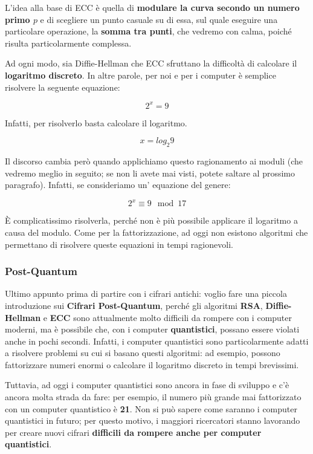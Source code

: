 \documentclass{report}
\begin{document}
L'idea alla base di ECC è quella di \textbf{modulare la curva secondo un numero primo $p$} e di scegliere un punto casuale su di essa, sul quale eseguire una particolare operazione, la \textbf{somma tra punti}, che vedremo con calma, poiché risulta particolarmente complessa.

Ad ogni modo, sia Diffie-Hellman che ECC sfruttano la difficoltà di calcolare il \textbf{logaritmo discreto}. In altre parole, per noi e per i computer è semplice risolvere la seguente equazione:

\begin{equation*}
    2 ^ x = 9
\end{equation*}

Infatti, per risolverlo basta calcolare il logaritmo.

\begin{equation*}
    x = log _ {2} 9
\end{equation*}

\newpage

Il discorso cambia però quando applichiamo questo ragionamento ai moduli (che vedremo meglio in seguito; se non li avete mai visti, potete saltare al prossimo paragrafo). Infatti, se consideriamo un' equazione del genere:

\begin{equation*}
    2 ^ x \equiv 9 \mod 17
\end{equation*}


È complicatissimo risolverla, perché non è più possibile applicare il logaritmo a causa del modulo. Come per la fattorizzazione, ad oggi non esistono algoritmi che permettano di risolvere queste equazioni in tempi ragionevoli.


\subsubsection{Post-Quantum}
Ultimo appunto prima di partire con i cifrari antichi: voglio fare una piccola introduzione sui \textbf{Cifrari Post-Quantum}, perché gli algoritmi \textbf{RSA}, \textbf{Diffie-Hellman} e \textbf{ECC} sono attualmente molto difficili da rompere con i computer moderni, ma è possibile che, con i computer \textbf{quantistici}, possano essere violati anche in pochi secondi. Infatti, i computer quantistici sono particolarmente adatti a risolvere problemi su cui si basano questi algoritmi: ad esempio, possono fattorizzare numeri enormi o calcolare il logaritmo discreto in tempi brevissimi.

Tuttavia, ad oggi i computer quantistici sono ancora in fase di sviluppo e c’è ancora molta strada da fare: per esempio, il numero più grande mai fattorizzato con un computer quantistico è \textbf{21}. Non si può sapere come saranno i computer quantistici in futuro; per questo motivo, i maggiori ricercatori stanno lavorando per creare nuovi cifrari \textbf{difficili da rompere anche per computer quantistici}.
\end{document}
